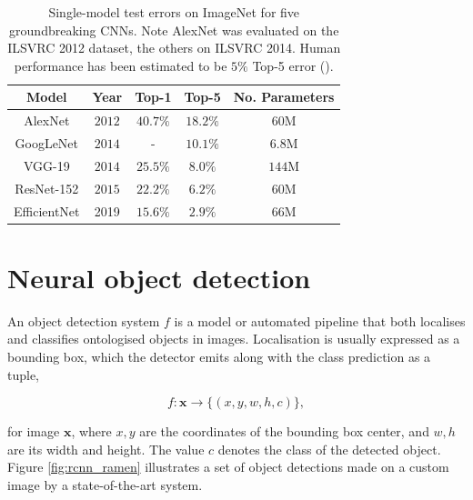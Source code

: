 \begin{table}
\centering
\begin{tabular}{|c|c|c|c|c|} 
\hline
 Model & Year &  Top-1 & Top-5 & No. Parameters \\ 
 \hline
 AlexNet & $2012$ & $40.7\%$ & $18.2\%$ & $60$M \\
 GoogLeNet & $2014$ & - & $10.1\%$ & $6.8$M\\
 VGG-19 & $2014$ & $25.5\%$ & $8.0\%$ & $144$M \\
 ResNet-152 & $2015$ & $22.2\%$ & $6.2\%$ & $60$M \\
 EfficientNet & 2019 & $15.6\%$ & $2.9\%$ & $66$M \\
 \hline
\end{tabular}
\caption{Single-model test errors on ImageNet for five groundbreaking CNNs. Note AlexNet was evaluated on the ILSVRC 2012 dataset, the others on ILSVRC 2014. Human performance has been estimated to be $5\%$ Top-5 error (\cite{karpathy2014learned}).}
\label{table:convnets}
\end{table}

\section{Neural object detection}


An object detection system $f$ is a model or automated pipeline that both localises and classifies ontologised objects in images. Localisation is usually expressed as a bounding box, which the detector emits along with the class prediction as a tuple,

\begin{equation}
f : \mathbf{x} \to \big\{(x, y, w, h, c)\big\},
\end{equation}

for image $\mathbf{x}$, where $x, y$ are the coordinates of the bounding box center, and $w, h$ are its width and height. The value $c$ denotes the class of the detected object. Figure \ref{fig:rcnn_ramen} illustrates a set of object detections made on a custom image by a state-of-the-art system.

